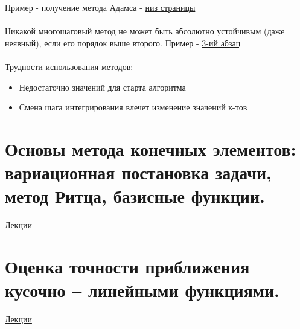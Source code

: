 \documentclass[specialist, subf, href, colorlinks=true, 12pt, times, mtpro, final]{disser}
\theoremstyle{definition}
\begin{document}
	Пример - получение метода Адамса - \hyperlink {lects.92}{низ страницы}\\\\

	
	Никакой многошаговый метод не может быть абсолютно устойчивым (даже неявный), если его порядок выше второго. Пример - \hyperlink {lects.93}{3-ий абзац}\\
	\\
	Трудности использования методов: 
	\begin{itemize}
	\item Недостаточно значений для старта алгоритма
	\item Смена шага интегрирования влечет изменение значений к-тов
	\end{itemize}

\section {Основы метода конечных элементов: вариационная постановка задачи, метод Ритца, базисные функции.}
	\hyperlink {lects.97}{Лекции}\\

\section {Оценка точности приближения кусочно -- линейными функциями.}
	\hyperlink {lects.102}{Лекции}\\
\end{document}
